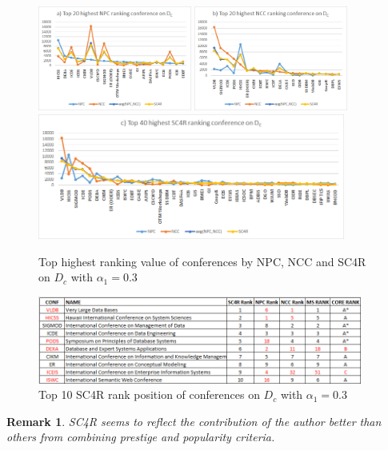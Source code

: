 \documentclass[10pt,leqno,twoside]{article}
\newtheorem{remark}{\indent Remark}[section]
\begin{document}
\begin{figure} 
	\caption{Top highest ranking value of conferences by NPC, NCC and SC4R on $D_c$ with $\alpha_1=0.3$}
	\label{Fig:Top20ConfDc}
    \centering
    \includegraphics[width=0.45\textwidth]{Dct20NPCc}
    \includegraphics[width=0.45\textwidth]{DCt20NCCc}
    \includegraphics[width=0.90\textwidth]{DCt40SC4Rc}   
\end{figure}
%
\begin{figure}
	\caption{Top 10 SC4R rank position of conferences on $D_c$ with $\alpha_1=0.3$}
	\label{Fig:Top10ConfDc}
    \centering
    \includegraphics[width=0.95\textwidth]{Top10Conf}
\end{figure}
%
\begin{remark}
SC4R seems to reflect the contribution of the author better than others from combining prestige and popularity criteria. 
\end{remark}
\end{document}
